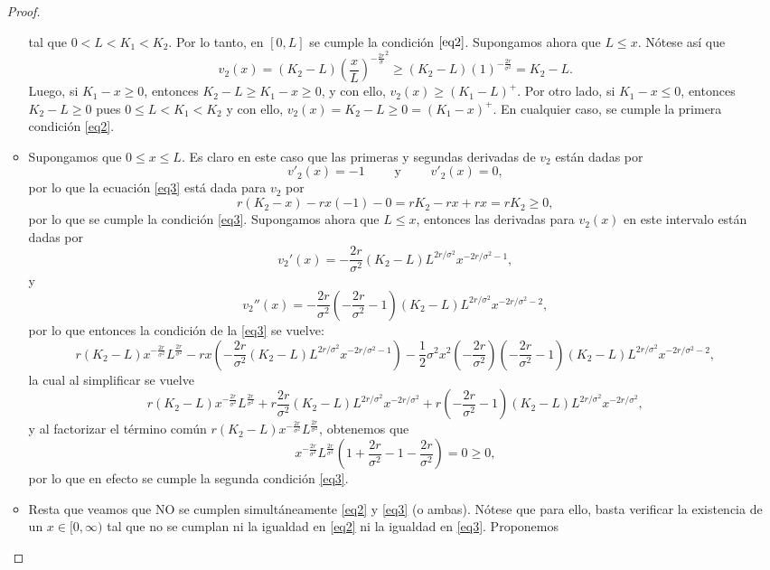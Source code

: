 \documentclass[letterpaper]{article}
\newcommand{\1}{\mathds{1}}
\theoremstyle{definition}
\theoremstyle{definition}
\theoremstyle{definition}
\theoremstyle{definition}
\theoremstyle{definition}
\begin{document}
\begin{itemize}
\begin{proof}
\begin{itemize}
        tal que $0<L<K_1<K_2$. 
        Por lo tanto, en $[0,L]$ se cumple la condición $\eqref{eq2}$. Supongamos ahora que 
        $L\leq x$. Nótese así que
        \[
            v_2(x)=(K_2-L)\left(\frac{x}{L}\right)^{-\frac{2r}{\sigma}^2}\geq (K_2-L)\left(1\right)^{-\frac{2r}{\sigma^2}}=K_2-L.
        \]
        Luego, si $K_1-x\geq0$, entonces $K_2-L\geq K_1-x\geq0$, y con ello, $v_2(x)\geq (K_1-L)^{+}$.
        Por otro lado, si $K_1-x\leq0$, entonces $K_2-L\geq0$ pues $0\leq L< K_1<K_2$ y con ello, $v_2(x)=K_2-L\geq0=(K_1-x)^{+}$.
        En cualquier caso, se cumple la primera condición \eqref{eq2}.
        \item Supongamos que $0\leq x\leq L$. Es claro en este caso que las primeras y segundas derivadas de $v_2$ están 
        dadas por 
        \[
            v'_2(x)=-1 \qquad \text{ y } \qquad v'_2(x)=0,
        \]
        por lo que la ecuación \eqref{eq3} está dada para $v_2$ por 
        \[
        r(K_2-x)-rx(-1)-0=rK_2-rx+rx=rK_2\geq0, 
        \]
        por lo que se cumple la condición \eqref{eq3}. Supongamos ahora que $L\leq x$, entonces 
        las derivadas para $v_2(x)$ en este intervalo están dadas por 
        \[
            v_2'(x)=-\frac{2r}{\sigma^2}(K_2-L)L^{2r/\sigma^2}x^{-2r/\sigma^2-1},
        \]
        y 
        \[
            v_2''(x)=-\frac{2r}{\sigma^2}\left(-\frac{2r}{\sigma^2}-1\right)(K_2-L)L^{2r/\sigma^2}x^{-2r/\sigma^2-2},
        \]  
        por lo que entonces la condición de la \eqref{eq3} se vuelve:
        \[
          r(K_2-L)x^{-\frac{2r}{\sigma^2}}L^{\frac{2r}{\sigma^2}}-rx \left(-\frac{2r}{\sigma^2}(K_2-L)L^{2r/\sigma^2}x^{-2r/\sigma^2-1}\right)-\frac{1}{2}\sigma^2x^2 \left(-\frac{2r}{\sigma^2}\right) \left(-\frac{2r}{\sigma^2}-1\right)(K_2-L)L^{2r/\sigma^2}x^{-2r/\sigma^2-2},
        \]
        la cual al simplificar se vuelve 
        \[
            r(K_2-L)x^{-\frac{2r}{\sigma^2}}L^{\frac{2r}{\sigma^2}}+r\frac{2r}{\sigma^2}(K_2-L)L^{2r/\sigma^2}x^{-2r/\sigma^2}+r\left(-\frac{2r}{\sigma^2}-1\right)(K_2-L)L^{2r/\sigma^2}x^{-2r/\sigma^2},
        \]
        y al factorizar el término común $r(K_2-L)x^{-\frac{2r}{\sigma^2}}L^{\frac{2r}{\sigma^2}}$, obtenemos que 
        \[
            x^{-\frac{2r}{\sigma^2}}L^{\frac{2r}{\sigma^2}} \left(1+\frac{2r}{\sigma^2}-1-\frac{2r}{\sigma^2}\right)=0\geq0,   
        \]
        por lo que en efecto se cumple la segunda condición \eqref{eq3}. 
        \item Resta que veamos que NO se cumplen simultáneamente \eqref{eq2} y \eqref{eq3} (o ambas). Nótese que para ello, basta verificar 
        la existencia de un $x\in [0,\infty)$ tal que no se cumplan ni la igualdad en \eqref{eq2} ni la igualdad en \eqref{eq3}. Proponemos 

\end{itemize}
\end{proof}
\end{itemize}
\end{document}
